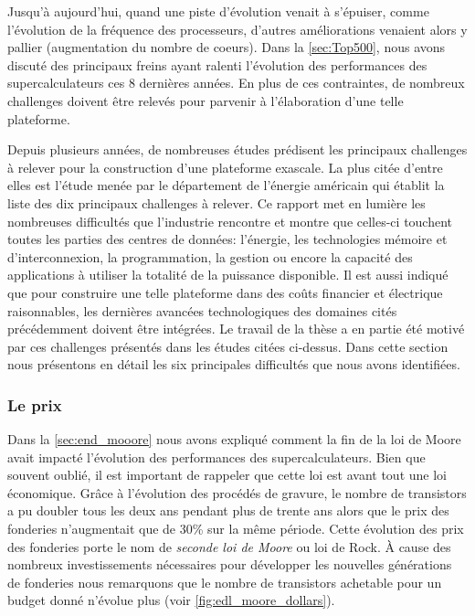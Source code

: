         
    Jusqu'à aujourd'hui, quand une piste d'évolution venait à s'épuiser, comme l'évolution de la fréquence des processeurs, d'autres améliorations venaient alors y pallier (augmentation du nombre de coeurs). Dans la \autoref{sec:Top500}, nous avons discuté des principaux freins ayant ralenti l'évolution des performances des supercalculateurs ces 8 dernières années. En plus de ces contraintes, de nombreux challenges doivent être relevés pour parvenir à l'élaboration d'une telle plateforme.
        
        
    Depuis plusieurs années, de nombreuses études \cite{Shalf2010, bergman2008exascale, Bergman2011} prédisent les principaux challenges à relever pour la construction d'une plateforme exascale. La plus citée d'entre elles est l'étude menée par le département de l'énergie américain \cite{Lucas2014} qui établit la liste des dix principaux challenges à relever. Ce rapport met en lumière les nombreuses difficultés que l'industrie rencontre et montre que celles-ci touchent toutes les parties des centres de données: l'énergie, les technologies mémoire et d'interconnexion, la programmation, la gestion ou encore la capacité des applications à utiliser la totalité de la puissance disponible. 
    Il est aussi indiqué que pour construire une telle plateforme dans des coûts financier et électrique raisonnables, les dernières avancées technologiques des domaines cités précédemment doivent être intégrées. Le travail de la thèse a en partie été motivé par ces challenges présentés dans les études citées ci-dessus. Dans cette section nous présentons en détail les six principales difficultés que nous avons identifiées. 

    \subsubsection{Le prix}\label{sec:edl_chal_prix}

    
        Dans la \autoref{sec:end_mooore} nous avons expliqué comment la fin de la loi de Moore avait impacté l'évolution des performances des supercalculateurs. Bien que souvent oublié, il est important de rappeler que cette loi est avant tout une loi économique.
        Grâce à l'évolution des procédés de gravure, le nombre de transistors a pu doubler tous les deux ans pendant plus de trente ans alors que le prix des fonderies n'augmentait que de 30\% sur la même période. Cette évolution des prix des fonderies porte le nom de \textit{seconde loi de Moore} ou loi de Rock. À cause des nombreux investissements nécessaires pour développer les nouvelles générations de fonderies nous remarquons que le nombre de transistors achetable pour un budget donné n'évolue plus (voir \autoref{fig:edl_moore_dollars}).
    
